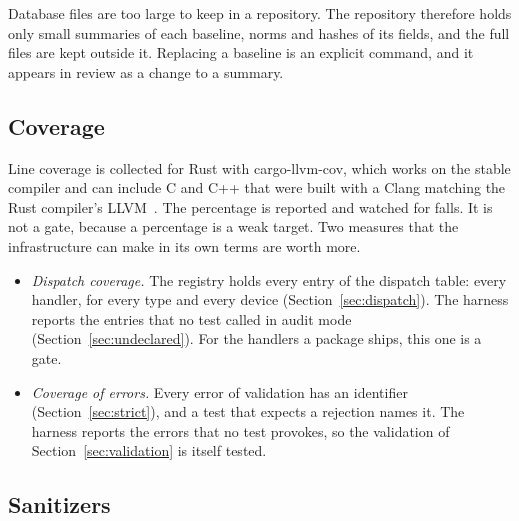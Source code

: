 \documentclass[11pt,a4paper]{article}
\begin{document}
Database files are too large to keep in a repository.  The repository
therefore holds only small summaries of each baseline, norms and hashes of
its fields, and the full files are kept outside it.  Replacing a baseline is
an explicit command, and it appears in review as a change to a summary.

\subsection{Coverage}

Line coverage is collected for Rust with cargo-llvm-cov, which works on the
stable compiler and can include C and C++ that were built with a Clang
matching the Rust compiler's LLVM~\cite{cargollvmcov}.  The percentage is
reported and watched for falls.  It is not a gate, because a percentage is
a weak target.  Two measures that the infrastructure can make in its own
terms are worth more.

\begin{itemize}
  \item \emph{Dispatch coverage.}  The registry holds every entry of the
        dispatch table: every handler, for every type and every device
        (Section~\ref{sec:dispatch}).  The harness reports the entries that
        no test called in audit mode (Section~\ref{sec:undeclared}).  For the handlers a package ships, this one is a
        gate.
  \item \emph{Coverage of errors.}  Every error of validation has an
        identifier (Section~\ref{sec:strict}), and a test that expects a
        rejection names it.  The harness reports the errors that no test
        provokes, so the validation of Section~\ref{sec:validation} is
        itself tested.
\end{itemize}

\subsection{Sanitizers}
\label{sec:sanitizers}
\end{document}
